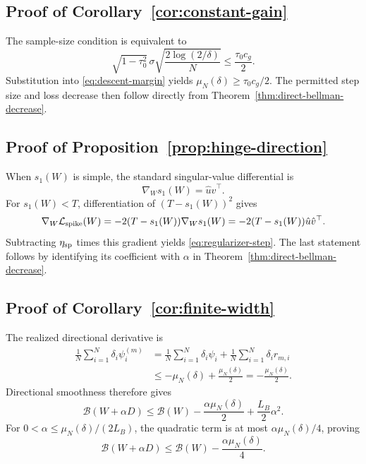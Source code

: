 \subsection{Proof of Corollary~\ref{cor:constant-gain}}

The sample-size condition is equivalent to
\begin{equation}
    \sqrt{1-\tau_0^2}\,\sigma
    \sqrt{\frac{2\log(2/\delta)}{N}}
    \le\frac{\tau_0c_g}{2}.
\end{equation}
Substitution into \eqref{eq:descent-margin} yields
$\mu_N(\delta)\ge\tau_0c_g/2$.  The permitted step size and loss decrease
then follow directly from Theorem~\ref{thm:direct-bellman-decrease}.

\subsection{Proof of Proposition~\ref{prop:hinge-direction}}

When $s_1(W)$ is simple, the standard singular-value differential is
\begin{equation}
    \nabla_Ws_1(W)=\hat u\hat v^\top.
\end{equation}
For $s_1(W)<T$, differentiation of
$(T-s_1(W))^2$ gives
\begin{equation}
    \nabla_W\mathcal L_{\rm spike}(W)
    =-2(T-s_1(W))\nabla_Ws_1(W)
    =-2(T-s_1(W))\hat u\hat v^\top.
\end{equation}
Subtracting $\eta_{\rm sp}$ times this gradient yields
\eqref{eq:regularizer-step}.  The last statement follows by identifying its
coefficient with $\alpha$ in Theorem~\ref{thm:direct-bellman-decrease}.

\subsection{Proof of Corollary~\ref{cor:finite-width}}

The realized directional derivative is
\begin{align}
    \frac1N\sum_{i=1}^N\delta_i\psi_i^{(m)}
    &=\frac1N\sum_{i=1}^N\delta_i\psi_i
      +\frac1N\sum_{i=1}^N\delta_i r_{m,i}\\
    &\le-\mu_N(\delta)+\frac{\mu_N(\delta)}{2}
     =-\frac{\mu_N(\delta)}{2}.
\end{align}
Directional smoothness therefore gives
\begin{equation}
    \mathcal B(W+\alpha D)
    \le\mathcal B(W)-\frac{\alpha\mu_N(\delta)}{2}
      +\frac{L_B}{2}\alpha^2.
\end{equation}
For $0<\alpha\le\mu_N(\delta)/(2L_B)$, the quadratic term is at most
$\alpha\mu_N(\delta)/4$, proving
\begin{equation}
    \mathcal B(W+\alpha D)
    \le\mathcal B(W)-\frac{\alpha\mu_N(\delta)}{4}.
\end{equation}

